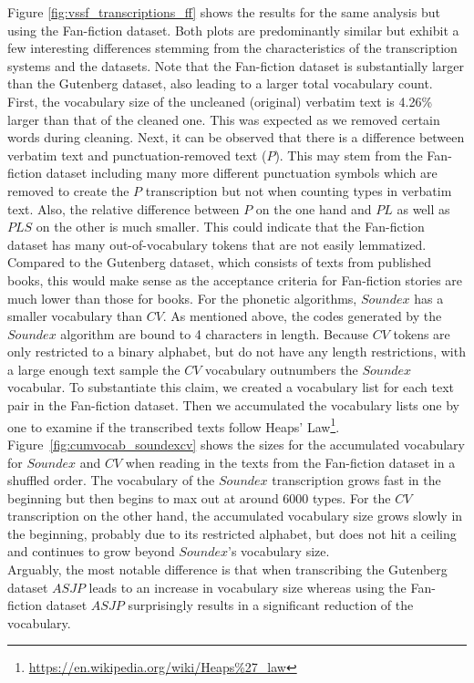 Figure \ref{fig:vssf_transcriptions_ff} shows the results for the same analysis but using the Fan-fiction dataset.
Both plots are predominantly similar but exhibit a few interesting differences stemming from the characteristics of the transcription systems and the datasets.
Note that the Fan-fiction dataset is substantially larger than the Gutenberg dataset, also leading to a larger total vocabulary count.\\
First, the vocabulary size of the uncleaned (original) verbatim text is 4.26\% larger than that of the cleaned one.
This was expected as we removed certain words during cleaning.
Next, it can be observed that there is a difference between verbatim text and punctuation-removed text ($P$).
This may stem from the Fan-fiction dataset including many more different punctuation symbols which are removed to create the $P$ transcription but not when counting types in verbatim text.
Also, the relative difference between $P$ on the one hand and $PL$ as well as $PLS$ on the other is much smaller.
This could indicate that the Fan-fiction dataset has many out-of-vocabulary tokens that are not easily lemmatized.
Compared to the Gutenberg dataset, which consists of texts from published books, this would make sense as the acceptance criteria for Fan-fiction stories are much lower than those for books.
For the phonetic algorithms, $Soundex$ has a smaller vocabulary than $CV$.
As mentioned above, the codes generated by the $Soundex$ algorithm are bound to 4 characters in length.
Because $CV$ tokens are only restricted to a binary alphabet, but do not have any length restrictions, with a large enough text sample the $CV$ vocabulary outnumbers the $Soundex$ vocabular.
To substantiate this claim, we created a vocabulary list for each text pair in the Fan-fiction dataset.
Then we accumulated the vocabulary lists one by one to examine if the transcribed texts follow Heaps' Law\footnote{\url{https://en.wikipedia.org/wiki/Heaps\%27_law}}.
Figure~\ref{fig:cumvocab_soundexcv} shows the sizes for the accumulated vocabulary for $Soundex$ and $CV$ when reading in the texts from the Fan-fiction dataset in a shuffled order.
The vocabulary of the $Soundex$ transcription grows fast in the beginning but then begins to max out at around 6000 types.
For the $CV$ transcription on the other hand, the accumulated vocabulary size grows slowly in the beginning, probably due to its restricted alphabet, but does not hit a ceiling and continues to grow beyond $Soundex$'s vocabulary size.\\
Arguably, the most notable difference is that when transcribing the Gutenberg dataset $ASJP$ leads to an increase in vocabulary size whereas using the Fan-fiction dataset $ASJP$ surprisingly results in a significant reduction of the vocabulary.
